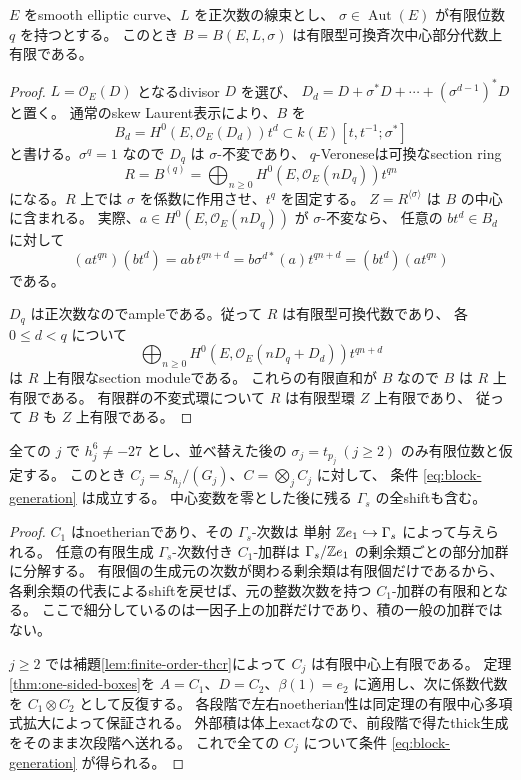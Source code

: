 \begin{lemma}[有限位数THCRの有限中心性]\label{lem:finite-order-thcr}
 \(E\) をsmooth elliptic curve、\(L\) を正次数の線束とし、
 \(\sigma\in\operatorname{Aut}(E)\) が有限位数 \(q\) を持つとする。
 このとき \(B=B(E,L,\sigma)\) は有限型可換斉次中心部分代数上有限である。
\end{lemma}
\begin{proof}
 \(L=\mathcal O_E(D)\) となるdivisor \(D\) を選び、
 \(D_d=D+\sigma^*D+\cdots+(\sigma^{d-1})^*D\) と置く。
 通常のskew Laurent表示により、\(B\) を
 \[
 B_d=H^0(E,\mathcal O_E(D_d))t^d
 \subset k(E)[t,t^{-1};\sigma^*]
 \]
 と書ける。\(\sigma^q=1\) なので \(D_q\) は \(\sigma\)-不変であり、
 \(q\)-Veroneseは可換なsection ring
 \[
 R=B^{(q)}=\bigoplus_{n\ge0}H^0(E,\mathcal O_E(nD_q))t^{qn}
 \]
 になる。\(R\) 上では \(\sigma\) を係数に作用させ、\(t^q\) を固定する。
 \(Z=R^{\langle\sigma\rangle}\) は \(B\) の中心に含まれる。
 実際、\(a\in H^0(E,\mathcal O_E(nD_q))\) が \(\sigma\)-不変なら、
 任意の \(bt^d\in B_d\) に対して
 \[
 (at^{qn})(bt^d)=ab\,t^{qn+d}
 =b\sigma^{d*}(a)t^{qn+d}=(bt^d)(at^{qn})
 \]
 である。

 \(D_q\) は正次数なのでampleである。従って \(R\) は有限型可換代数であり、
 各 \(0\le d<q\) について
 \[
 \bigoplus_{n\ge0}H^0(E,\mathcal O_E(nD_q+D_d))t^{qn+d}
 \]
 は \(R\) 上有限なsection moduleである。
 これらの有限直和が \(B\) なので \(B\) は \(R\) 上有限である。
 有限群の不変式環について \(R\) は有限型環 \(Z\) 上有限であり、
 従って \(B\) も \(Z\) 上有限である。
\end{proof}




\begin{corollary}[一つの任意位数因子を含む生成条件]\label{cor:PI-generation}
 全ての \(j\) で \(h_j^6\ne-27\) とし、並べ替えた後の
 \(\sigma_j=t_{p_j}\ (j\ge2)\) のみ有限位数と仮定する。
 このとき \(C_j=S_{h_j}/(G_j)\)、\(C=\bigotimes_jC_j\) に対して、
 条件 \eqref{eq:block-generation} は成立する。
 中心変数を零とした後に残る \(\Gamma_s\) の全shiftも含む。
\end{corollary}
\begin{proof}
 \(C_1\) はnoetherianであり、その \(\Gamma_s\)-次数は
 単射 \(\mathbb Z e_1\hookrightarrow\Gamma_s\) によって与えられる。
 任意の有限生成 \(\Gamma_s\)-次数付き \(C_1\)-加群は
 \(\Gamma_s/\mathbb Z e_1\) の剰余類ごとの部分加群に分解する。
 有限個の生成元の次数が関わる剰余類は有限個だけであるから、
 各剰余類の代表によるshiftを戻せば、元の整数次数を持つ \(C_1\)-加群の有限和となる。
 ここで細分しているのは一因子上の加群だけであり、積の一般の加群ではない。

 \(j\ge2\) では補題\ref{lem:finite-order-thcr}によって \(C_j\) は有限中心上有限である。
 定理\ref{thm:one-sided-boxes}を
 \(A=C_1\)、\(D=C_2\)、\(\beta(1)=e_2\) に適用し、次に係数代数を
 \(C_1\otimes C_2\) として反復する。
 各段階で左右noetherian性は同定理の有限中心多項式拡大によって保証される。
 外部積は体上exactなので、前段階で得たthick生成をそのまま次段階へ送れる。
 これで全ての \(C_j\) について条件 \eqref{eq:block-generation} が得られる。
\end{proof}

